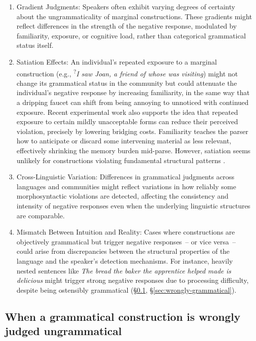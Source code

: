 \begin{enumerate}
    \item Gradient Judgments: Speakers often exhibit varying degrees of certainty about the ungrammaticality of marginal constructions. These gradients might reflect differences in the strength of the negative response, modulated by familiarity, exposure, or cognitive load, rather than categorical grammatical status itself.

    \item Satiation Effects: An individual's repeated exposure to a marginal construction (e.g., \textsuperscript{?}\textit{I saw Joan, a friend of whose was visiting}) might not change its grammatical status in the community but could attenuate the individual's negative response by increasing familiarity, in the same way that a dripping faucet can shift from being annoying to unnoticed with continued exposure. Recent experimental work \autocite{hawkins2014,Gibson2024} also supports the idea that repeated exposure to certain mildly unacceptable forms can reduce their perceived violation, precisely by lowering bridging costs. Familiarity teaches the parser how to anticipate or discard some intervening material as less relevant, effectively shrinking the memory burden mid-parse. However, satiation seems unlikely for constructions violating fundamental structural patterns \autocite[cf.][]{Snyder2022}.

    \item Cross-Linguistic Variation: Differences in grammatical judgments across languages and communities might reflect variations in how reliably some morphosyntactic violations are detected, affecting the consistency and intensity of negative responses even when the underlying linguistic structures are comparable.

    \item Mismatch Between Intuition and Reality: Cases where constructions are objectively grammatical but trigger negative responses~-- or vice versa~-- could arise from discrepancies between the structural properties of the language and the speaker's detection mechanisms. For instance, heavily nested sentences like \textit{The bread the baker the apprentice helped made is delicious} might trigger strong negative responses due to processing difficulty, despite being ostensibly grammatical (\S\ref{sec:wrongly-ungrammatical}, \S\ref{sec:wrongly-grammatical}).
\end{enumerate}

\subsection{When a grammatical construction is wrongly judged ungrammatical}\label{sec:wrongly-ungrammatical}

